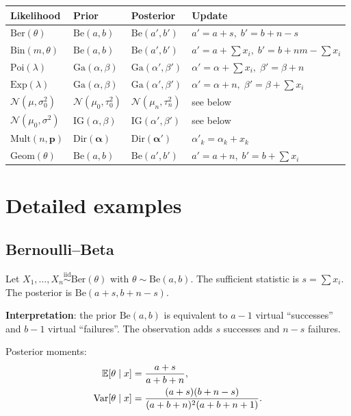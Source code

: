 \begin{keyformulas}[title=\textbf{Main conjugate families}]
\begin{center}
\renewcommand{\arraystretch}{1.4}
\begin{tabular}{llll}
\toprule
\textbf{Likelihood} & \textbf{Prior} & \textbf{Posterior} & \textbf{Update} \\
\midrule
$\text{Ber}(\theta)$ & $\text{Be}(a,b)$ & $\text{Be}(a',b')$ &
  $a'=a+s,\; b'=b+n-s$ \\
$\text{Bin}(m,\theta)$ & $\text{Be}(a,b)$ & $\text{Be}(a',b')$ &
  $a'=a+\sum x_i,\; b'=b+nm-\sum x_i$ \\
$\text{Poi}(\lambda)$ & $\text{Ga}(\alpha,\beta)$ & $\text{Ga}(\alpha',\beta')$ &
  $\alpha'=\alpha+\sum x_i,\; \beta'=\beta+n$ \\
$\text{Exp}(\lambda)$ & $\text{Ga}(\alpha,\beta)$ & $\text{Ga}(\alpha',\beta')$ &
  $\alpha'=\alpha+n,\; \beta'=\beta+\sum x_i$ \\
$\mathcal{N}(\mu,\sigma^2_0)$ & $\mathcal{N}(\mu_0,\tau^2_0)$ &
  $\mathcal{N}(\mu_n,\tau^2_n)$ & see below \\
$\mathcal{N}(\mu_0,\sigma^2)$ & $\text{IG}(\alpha,\beta)$ &
  $\text{IG}(\alpha',\beta')$ & see below \\
$\text{Mult}(n,\mathbf{p})$ & $\text{Dir}(\boldsymbol{\alpha})$ &
  $\text{Dir}(\boldsymbol{\alpha}')$ &
  $\alpha'_k = \alpha_k + x_k$ \\
$\text{Geom}(\theta)$ & $\text{Be}(a,b)$ & $\text{Be}(a',b')$ &
  $a'=a+n,\; b'=b+\sum x_i$ \\
\bottomrule
\end{tabular}
\end{center}
\end{keyformulas}

\section{Detailed examples}

\subsection{Bernoulli--Beta}

\begin{example}
Let $X_1, \ldots, X_n \overset{\text{iid}}{\sim} \text{Ber}(\theta)$
with $\theta \sim \text{Be}(a, b)$. The sufficient statistic is
$s = \sum x_i$. The posterior is $\text{Be}(a + s, b + n - s)$.

\textbf{Interpretation}: the prior $\text{Be}(a,b)$ is equivalent to
$a - 1$ virtual ``successes'' and $b - 1$ virtual ``failures''.
The observation adds $s$ successes and $n - s$ failures.

Posterior moments:
\begin{align*}
  \mathbb{E}[\theta \mid x] &= \frac{a + s}{a + b + n}, \\
  \mathrm{Var}[\theta \mid x] &= \frac{(a+s)(b+n-s)}{(a+b+n)^2(a+b+n+1)}.
\end{align*}
\end{example}

